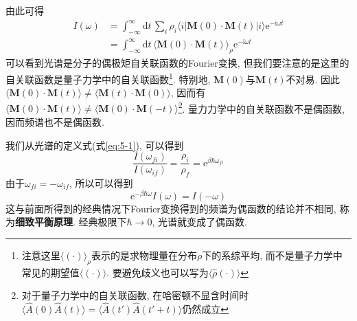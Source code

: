     由此可得
    \begin{equation}\begin{aligned}
        I(\omega) 
        &= \int_{-\infty}^{\infty} \mathrm{d}t\, \sum_{i} \rho_i \langle i|\bm{M}(0) \cdot \bm{M}(t) |i \rangle \mathrm{e}^{-\mathrm{i} \omega t} \\
        &= \int_{-\infty}^{\infty} \mathrm{d}t\, \langle \bm{M}(0) \cdot \bm{M}(t) \rangle_\rho \mathrm{e}^{-\mathrm{i} \omega t}
    \end{aligned}\end{equation}
    可以看到光谱是分子的偶极矩自关联函数的Fourier变换, 但我们要注意的是这里的自关联函数是量子力学中的自关联函数\footnote{注意这里$\langle (\cdot) \rangle_\rho$表示的是求物理量在分布$\rho$下的系综平均, 而不是量子力学中常见的期望值$\langle (\cdot) \rangle$. 要避免歧义也可以写为$\langle \hat\rho (\cdot) \rangle$}. 特别地, $\bm{M}(0)$与$\bm{M}(t)$不对易. 因此$\langle \bm{M}(0) \cdot \bm{M}(t) \rangle \neq \langle \bm{M}(t) \cdot \bm{M}(0) \rangle$, 因而有$\langle \bm{M}(0) \cdot \bm{M}(t) \rangle \neq \langle \bm{M}(0) \cdot \bm{M}(-t) \rangle$\footnote{对于量子力学中的自关联函数, 在哈密顿不显含时间时$\langle \hat A(0) \hat A(t) \rangle = \langle \hat A(t') \hat A(t'+t) \rangle$仍然成立}. 量力力学中的自关联函数不是偶函数, 因而频谱也不是偶函数.

    我们从光谱的定义式(式\ref{eq:5-1}), 可以得到
    \begin{equation}
        \frac{I(\omega_{fi})}{I(\omega_{if})} = \frac{\rho_i}{\rho_f} = \mathrm{e}^{\beta\hbar\omega_{fi}}
    \end{equation}
    由于$\omega_{fi} = - \omega_{if}$, 所以可以得到
    \begin{equation}
        \mathrm{e}^{-\beta \hbar \omega} I(\omega) = I(-\omega)
    \end{equation}
    这与前面所得到的经典情况下Fourier变换得到的频谱为偶函数的结论并不相同, 称为\textbf{细致平衡原理}. 经典极限下$\hbar \to 0$, 光谱就变成了偶函数. 
    
    
    